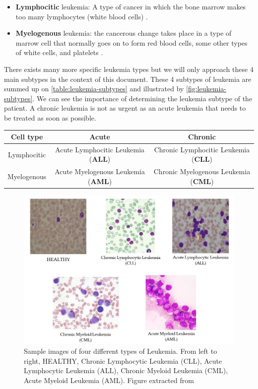 \documentclass[11pt, openany]{report}
\theoremstyle{plain}
\theoremstyle{definition}
\theoremstyle{remark}
\begin{document}
\begin{itemize}
\item \textbf{Lymphocitic} leukemia: A type of cancer in which the bone marrow makes too many lymphocytes (white blood cells) \cite{NCI}. 
\item \textbf{Myelogenous} leukemia: the cancerous change takes place in a type of marrow cell that normally goes on to form red blood cells, some other types of white cells, and platelets \cite{wiki-leukemia}. 
\end{itemize} 

There exists many more specific leukemia types but we will only approach these 4 main subtypes in the context of this document. These 4 subtypes of leukemia are summed up on \autoref{table:leukemia-subtypes} and illustrated by \autoref{fig:leukemia-subtypes}. 
We can see the importance of determining the leukemia subtype of the patient. A chronic leukemia is not as urgent as an acute leukemia that needs to be treated as soon as possible. 

\begin{center}
    \begin{tabular}{|c|c|c|}
      \hline
      Cell type & Acute & Chronic \\
      \hline
      Lymphocitic & Acute Lymphocitic Leukemia (\textbf{ALL}) & Chronic Lymphocitic Leukemia (\textbf{CLL})  \\
      \hline
      Myelogenous & Acute Myelogenous Leukemia (\textbf{AML})  & Chronic Myelogenous Leukemia (\textbf{CML})  \\
      \hline
    \end{tabular}
    \label{table:leukemia-subtypes}
\end{center}

\begin{figure}[H]
  \centering
  \includegraphics[scale=0.6]{figures/leukemia-subtypes.png}
  \caption{Sample images of four different types of Leukemia. From left to right, HEALTHY, Chronic Lymphocytic Leukemia (CLL), Acute Lymphocytic Leukemia (ALL), Chronic Myeloid Leukemia (CML), Acute Myeloid Leukemia (AML). Figure extracted from \cite{leukemia}}
  \label{fig:leukemia-subtypes}
\end{figure}
\end{document}

